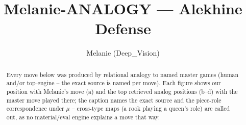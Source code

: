 \documentclass[11pt]{article}
\title{Melanie-ANALOGY — Alekhine Defense}
\author{Melanie (Deep\_Vision)}
\date{}
\begin{document}
\maketitle

\begin{abstract}Every move below was produced by relational analogy to named master games (human and/or top-engine -- the exact source is named per move). Each figure shows our position with Melanie's move (a) and the top retrieved analog positions (b--d) with the master move played there; the caption names the exact source and the piece-role correspondence under $\mu$ -- cross-type maps (a rook playing a queen's role) are called out, as no material/eval engine explains a move that way.\end{abstract}

\begin{figure}[p]\centering
\begin{subfigure}{0.46\textwidth}\centering
\resizebox{\linewidth}{!}{%
\newchessgame
\chessboard[
  setfen={rnbqk2r/ppp1ppbp/1n1p2p1/4P3/3P4/1B3N2/PPP2PPP/RNBQK2R w KQkq - 4 7},
  showmover=false,
  pgfstyle=straightmove, color=movearrow, markmove={h1-g1}
]}
\caption{}
\end{subfigure}\hfill
\begin{subfigure}{0.46\textwidth}\centering
\resizebox{\linewidth}{!}{%
\newchessgame
\chessboard[
  setfen={rnbqkb1r/pp3ppp/2p2n2/3pp3/4P3/1B1P1N2/PPP2PPP/RNBQK2R b KQkq - 1 5},
  showmover=false,
  pgfstyle=straightmove, color=movearrow, markmove={f8-d6}
]}
\caption{}
\end{subfigure}
\\[4pt]
\begin{subfigure}{0.46\textwidth}\centering
\resizebox{\linewidth}{!}{%
\newchessgame
\chessboard[
  setfen={rnbqkb1r/pp3ppp/2p2n2/3pp3/4P3/1B1P1N2/PPP2PPP/RNBQK2R b KQkq - 1 5},
  showmover=false,
  pgfstyle=straightmove, color=movearrow, markmove={f8-d6}
]}
\caption{}
\end{subfigure}\hfill
\begin{subfigure}{0.46\textwidth}\centering
\resizebox{\linewidth}{!}{%
\newchessgame
\chessboard[
  setfen={rnbqkb1r/pp3ppp/2p2n2/3pp3/4P3/1B1P1N2/PPP2PPP/RNBQK2R b KQkq - 1 5},
  showmover=false,
  pgfstyle=straightmove, color=movearrow, markmove={f8-d6}
]}
\caption{}
\end{subfigure}

\end{figure}
\end{document}

